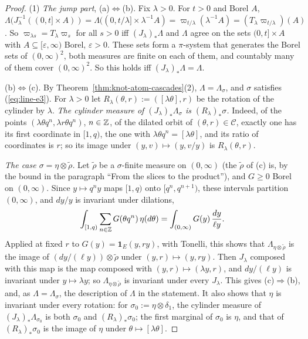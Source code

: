 \begin{proof}
\leanok
{}
(1) \emph{The jump part}, (a)$\Leftrightarrow$(b). Fix $\lambda > 0$. For $t > 0$ and Borel $A$,
$\Lambda(J_\lambda^{-1}((0,t] \times A)) = \Lambda((0,t/\lambda] \times \lambda^{-1}A)
= \varpi_{t/\lambda}(\lambda^{-1}A) = (T_\lambda\varpi_{t/\lambda})(A)$. So
$\varpi_{\lambda s} = T_\lambda\varpi_s$ for all $s > 0$ iff $(J_\lambda)_*\Lambda$ and $\Lambda$
agree on the sets $(0,t] \times A$ with $A \subseteq [\varepsilon,\infty)$ Borel, $\varepsilon > 0$.
These sets form a $\pi$-system that generates the Borel sets of $(0,\infty)^2$, both measures are
finite on each of them, and countably many of them cover $(0,\infty)^2$. So this holds iff
$(J_\lambda)_*\Lambda = \Lambda$.

(b)$\Leftrightarrow$(c). By Theorem~\ref{thm:knot-atom-cascades}(2), $\Lambda = \Lambda_\sigma$,
and $\sigma$ satisfies (\ref{eq:line-e3}). For $\lambda > 0$ let $R_\lambda(\theta, r) := ([\lambda\theta], r)$
be the rotation of the cylinder by $\lambda$. \emph{The cylinder measure of
$(J_\lambda)_*\Lambda_\sigma$ is $(R_\lambda)_*\sigma$.} Indeed, of the points
$(\lambda\theta q^n, \lambda r\theta q^n)$, $n \in \mathbb{Z}$, of the dilated orbit of
$(\theta, r) \in \mathcal{C}$, exactly one has its first coordinate in $[1,q)$, the one with
$\lambda\theta q^n = [\lambda\theta]$, and its ratio of coordinates is $r$; so its image under
$(y,v) \mapsto (y, v/y)$ is $R_\lambda(\theta, r)$.

\emph{The case $\sigma = \eta \otimes \tilde\rho$.} Let $\tilde\rho$ be a $\sigma$-finite measure
on $(0,\infty)$ (the $\tilde\rho$ of (c) is, by the bound in the paragraph ``From the slices to the
product''), and $G \ge 0$ Borel on $(0,\infty)$. Since $y \mapsto q^ny$ maps $[1,q)$ onto
$[q^n, q^{n+1})$, these intervals partition $(0,\infty)$, and $dy/y$ is invariant under dilations,
\[
  \int_{[1,q)}\sum_{n \in \mathbb{Z}}G(\theta q^n)\,\eta(d\theta) = \int_{(0,\infty)}G(y)\,\frac{dy}{\ell y} .
\]
Applied at fixed $r$ to $G(y) = \mathbf 1_E(y, ry)$, with Tonelli, this shows that
$\Lambda_{\eta \otimes \tilde\rho}$ is the image of $(dy/(\ell y)) \otimes \tilde\rho$ under
$(y,r) \mapsto (y, ry)$. Then $J_\lambda$ composed with this map is the map composed with
$(y,r) \mapsto (\lambda y, r)$, and $dy/(\ell y)$ is invariant under $y \mapsto \lambda y$; so
$\Lambda_{\eta \otimes \tilde\rho}$ is invariant under every $J_\lambda$. This gives
(c)$\Rightarrow$(b), and, as $\Lambda = \Lambda_\sigma$, the description of $\Lambda$ in the
statement. It also shows that $\eta$ is invariant under every rotation: for
$\sigma_0 := \eta \otimes \delta_1$, the cylinder measure of $(J_\lambda)_*\Lambda_{\sigma_0}$ is
both $\sigma_0$ and $(R_\lambda)_*\sigma_0$; the first marginal of $\sigma_0$ is $\eta$, and that of
$(R_\lambda)_*\sigma_0$ is the image of $\eta$ under $\theta \mapsto [\lambda\theta]$.


\end{proof}
